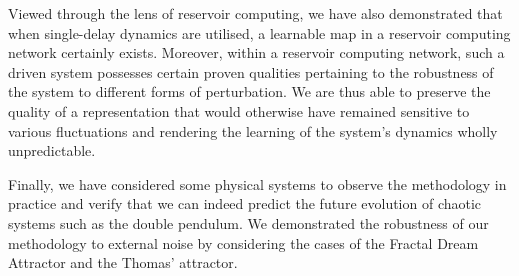 Viewed through the lens of reservoir computing, we have also demonstrated that when single-delay dynamics are utilised, a learnable map in a reservoir computing network certainly exists. 
Moreover, within a reservoir computing network, such a driven system possesses certain proven qualities pertaining to the robustness of the system to different forms of perturbation. 
We are thus able to preserve the quality of a representation that would otherwise have remained sensitive to various fluctuations and rendering the learning of the system's dynamics wholly unpredictable. 


Finally, we have considered some physical systems to observe the methodology in practice and verify that we can indeed predict the future evolution of chaotic systems such as the double pendulum.
We demonstrated the robustness of our methodology to external noise by considering the cases of the  Fractal Dream Attractor and the Thomas' attractor.

